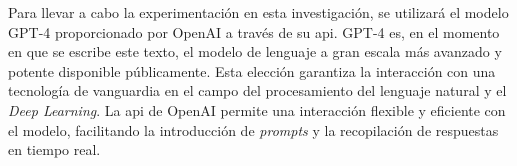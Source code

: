 




Para llevar a cabo la experimentación en esta investigación, se utilizará el modelo GPT-4 proporcionado por OpenAI a través de su \gls{api}. GPT-4 es, en el momento en que se escribe este texto, el modelo de lenguaje a gran escala más avanzado y potente disponible públicamente. Esta elección garantiza la interacción con una tecnología de vanguardia en el campo del procesamiento del lenguaje natural y el \emph{Deep Learning}. La \gls{api} de OpenAI permite una interacción flexible y eficiente con el modelo, facilitando la introducción de \emph{prompts} y la recopilación de respuestas en tiempo real.